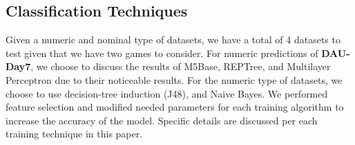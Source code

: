\subsection{Classification Techniques}
Given a numeric and nominal type of datasets, we have a total of 4 datasets to test given that we have two games to consider. For numeric predictions of \textbf{DAU-Day7}, we choose to discuss the results of M5Base, REPTree, and Multilayer Perceptron due to their noticeable results. For the numeric type of datasets, we choose to use decision-tree induction (J48), and Naive Bayes. We performed feature selection and modified needed parameters for each training algorithm to increase the accuracy of the model. Specific details are discussed per each training technique in this paper.
